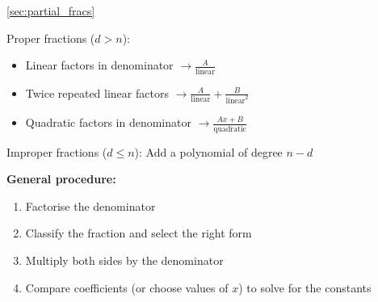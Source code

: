 \begin{recap}{\ref{sec:partial_fracs}}
\item Proper fractions ($d>n$):
\begin{itemize}
\item Linear factors in denominator $\rightarrow \frac{A}{\text{linear}}$
\item Twice repeated linear factors $\rightarrow \frac{A}{\text{linear}}+\frac{B}{\text{linear}^2}$
\item Quadratic factors in denominator $\rightarrow \frac{Ax+B}{\text{quadratic}}$
\end{itemize}
\item Improper fractions ($d\leq n$): Add a polynomial of degree $n-d$
\item \textbf{General procedure:}
\begin{enumerate}
    \item Factorise the denominator
    \item Classify the fraction and select the right form
    \item Multiply both sides by the denominator
    \item Compare coefficients (or choose values of $x$) to solve for the constants
\end{enumerate}
\end{recap}
